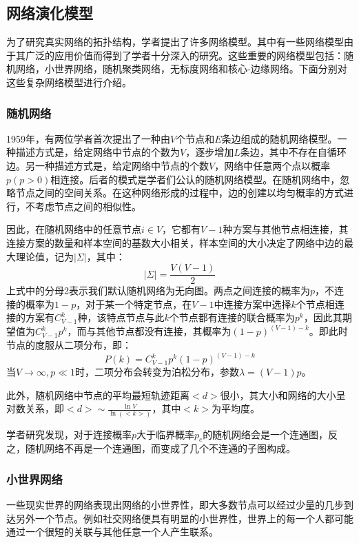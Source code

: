 \documentclass{ctexart}
\begin{document}
        \subsection{网络演化模型}
            为了研究真实网络的拓扑结构，学者提出了许多网络模型。其中有一些网络模型由于其广泛的应用价值而得到了学者十分深入的研究。这些重要的网络模型包括：随机网络，小世界网络，随机聚类网络，无标度网络和核心-边缘网络。下面分别对这些复杂网络模型进行介绍。
            \subsubsection{随机网络}
                1959年，有两位学者首次提出了一种由$V$个节点和$E$条边组成的随机网络模型。一种描述方式是，给定网络中节点的个数为$V$，逐步增加$L$条边，其中不存在自循环边。另一种描述方式是，给定网络中节点的个数$V$，网络中任意两个点以概率$p(p>0)$相连接。后者的模式是学者们公认的随机网络模型。在随机网络中，忽略节点之间的空间关系。在这种网络形成的过程中，边的创建以均匀概率的方式进行，不考虑节点之间的相似性。

                因此，在随机网络中的任意节点$i \in V$，它都有$V-1$种方案与其他节点相连接，其连接方案的数量和样本空间的基数大小相关，样本空间的大小决定了网络中边的最大理论值，记为$|\Sigma|$，其中：
                \begin{equation}
                    |\Sigma| = \frac{V(V-1)}{2}
                \end{equation}
                上式中的分母2表示我们默认随机网络为无向图。两点之间连接的概率为$p$，不连接的概率为$1-p$，对于某一个特定节点，在$V-1$中连接方案中选择$k$个节点相连接的方案有$C_{V-1}^k$种，该特点节点与此$k$个节点都有连接的联合概率为$p^k$，因此其期望值为$C_{V-1}^k p^k$，而与其他节点都没有连接，其概率为$(1-p)^{(V-1)-k}$。即此时节点的度服从二项分布，即：
                \begin{equation}
                    P(k) = C_{V-1}^k p^k(1-p)^{(V-1)-k}
                \end{equation}
                当$V\rightarrow \infty,p \ll 1$时，二项分布会转变为泊松分布，参数$\lambda=(V-1) p$。

                此外，随机网络中节点的平均最短轨迹距离$<d>$很小，其大小和网络的大小呈对数关系，即$<d>\sim \frac{\ln V}{\ln (<k>)}$，其中$<k>$为平均度。

                学者研究发现，对于连接概率$p$大于临界概率$p_c$的随机网络会是一个连通图，反之，随机网络不再是一个连通图，而变成了几个不连通的子图构成。
            \subsubsection{小世界网络}
                一些现实世界的网络表现出网络的小世界性，即大多数节点可以经过少量的几步到达另外一个节点。例如社交网络便具有明显的小世界性，世界上的每一个人都可能通过一个很短的关联与其他任意一个人产生联系。
\end{document}
